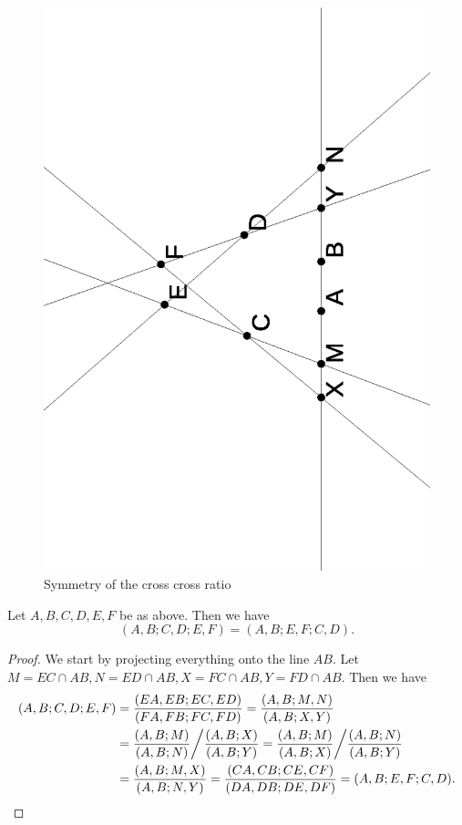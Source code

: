 \begin{figure}[!htb]
\centering
\includegraphics[scale=0.5,angle=270]{ccr.eps}
\caption{Symmetry of the cross cross ratio}
\end{figure}

\begin{thm} Let $A,B,C,D,E,F$ be as above. Then we have
\[
(A,B;C,D;E,F) = (A,B;E,F;C,D).
\]
\end{thm}
\begin{proof} We start by projecting everything onto the line $AB$. Let $M = EC\cap AB, N = ED\cap AB, X = FC\cap AB, Y = FD\cap AB$. Then we have
\begin{align*}
(A,B;C,D;E,F) &= \frac{(EA,EB;EC,ED)}{(FA,FB;FC,FD)} = \frac{(A,B;M,N)}{(A,B;X,Y)}\\
&= \frac{(A,B;M)}{(A,B;N)}\bigg/\frac{(A,B;X)}{(A,B;Y)} = \frac{(A,B;M)}{(A,B;X)}\bigg/\frac{(A,B;N)}{(A,B;Y)}\\
&= \frac{(A,B;M,X)}{(A,B;N,Y)} = \frac{(CA,CB;CE,CF)}{(DA,DB;DE,DF)} = (A,B;E,F;C,D).\qedhere
\end{align*}
\end{proof}

